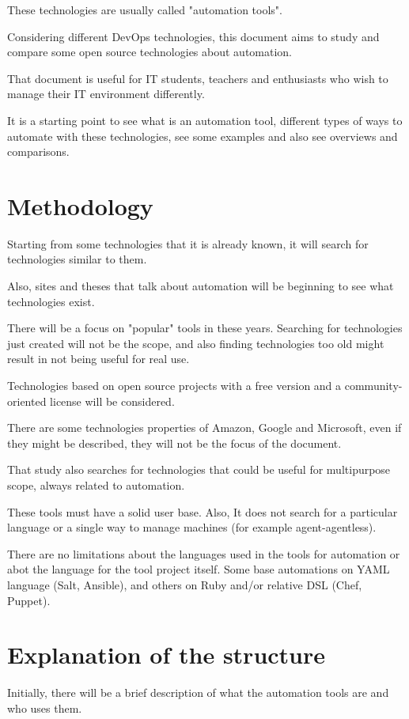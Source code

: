 \documentclass[12pt,a4paper,openright,twoside]{book}
\begin{document}
These technologies are usually called "automation tools".

Considering different DevOps technologies, this document aims to study and compare some open source technologies about automation.

That document is useful for IT students, teachers and enthusiasts who wish to manage their IT environment differently.

It is a starting point to see what is an automation tool, different types of ways to automate with these technologies, see some examples and also see overviews and comparisons.

\section{Methodology}
Starting from some technologies that it is already known, it will search for technologies similar to them.


Also, sites and theses that talk about automation will be beginning to see what technologies exist.


There will be a focus on "popular" tools in these years. Searching for technologies just created will not be the scope, and also finding technologies too old might result in not being useful for real use.


Technologies based on open source projects with a free version and a community-oriented license will be considered.


There are some technologies properties of Amazon, Google and Microsoft, even if they might be described, they will not be the focus of the document.


That study also searches for technologies that could be useful for multipurpose scope, always related to automation.


These tools must have a solid user base. Also, It does not search for a particular language or a single way to manage machines (for example agent-agentless).


There are no limitations about the languages used in the tools for automation or abot the language for the tool project itself. Some base automations on YAML language (Salt, Ansible), and others on Ruby and/or relative DSL (Chef, Puppet).

\section{Explanation of the structure}
Initially, there will be a brief description of what the automation tools are and who uses them.
\end{document}
